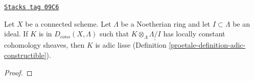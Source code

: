 \begin{lemma}
\label{proetale-lemma-connected-adic-lisse}
\href{https://stacks.math.columbia.edu/tag/09C6}{\texttt{Stacks tag 09C6}}

Let $X$ be a connected scheme. Let $\Lambda$ be a Noetherian ring and let
$I \subset \Lambda$ be an ideal. If $K$ is in $D_{cons}(X, \Lambda)$
such that $K \otimes_\Lambda \underline{\Lambda/I}$
has locally constant cohomology sheaves, then $K$ is adic lisse
(Definition \ref{proetale-definition-adic-constructible}).
\end{lemma}

\begin{proof}


\end{proof}
